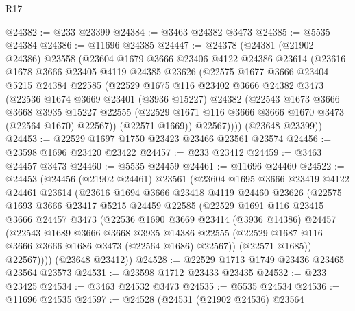 \begin{lexlean}{R17}
\begin{coremodule}
@24382 := @233 @23399
@24384 := @3463 @24382 @3473
@24385 := @5535 @24384
@24386 := @11696 @24385
@24447 := @24378
    (@24381
      (@21902 @24386)
      @23558
      (@23604
        @1679
        @3666
        @23406
        @4122
        @24386
        @23614
        (@23616
          @1678
          @3666
          @23405
          @4119
          @24385
          @23626
          (@22575
            @1677
            @3666
            @23404
            @5215
            @24384
            @22585
            (@22529
              @1675
              @116
              @23402
              @3666
              @24382
              @3473
              (@22536
                @1674
                @3669
                @23401
                (@3936 @15227)
                @24382
                (@22543
                  @1673
                  @3666
                  @3668
                  @3935
                  @15227
                  @22555
                  (@22529 @1671 @116 @3666 @3666 @1670 @3473 (@22564 @1670) @22567))
                (@22571 @1669))
              @22567))))
      (@23648 @23399))
@24453 := @22529 @1697 @1750 @23423 @23466 @23561 @23574
@24456 := @23598 @1696 @23420 @23422
@24457 := @233 @23412
@24459 := @3463 @24457 @3473
@24460 := @5535 @24459
@24461 := @11696 @24460
@24522 := @24453
    (@24456
      (@21902 @24461)
      @23561
      (@23604
        @1695
        @3666
        @23419
        @4122
        @24461
        @23614
        (@23616
          @1694
          @3666
          @23418
          @4119
          @24460
          @23626
          (@22575
            @1693
            @3666
            @23417
            @5215
            @24459
            @22585
            (@22529
              @1691
              @116
              @23415
              @3666
              @24457
              @3473
              (@22536
                @1690
                @3669
                @23414
                (@3936 @14386)
                @24457
                (@22543
                  @1689
                  @3666
                  @3668
                  @3935
                  @14386
                  @22555
                  (@22529 @1687 @116 @3666 @3666 @1686 @3473 (@22564 @1686) @22567))
                (@22571 @1685))
              @22567))))
      (@23648 @23412))
@24528 := @22529 @1713 @1749 @23436 @23465 @23564 @23573
@24531 := @23598 @1712 @23433 @23435
@24532 := @233 @23425
@24534 := @3463 @24532 @3473
@24535 := @5535 @24534
@24536 := @11696 @24535
@24597 := @24528
    (@24531
      (@21902 @24536)
      @23564

\end{coremodule}
\end{lexlean}
